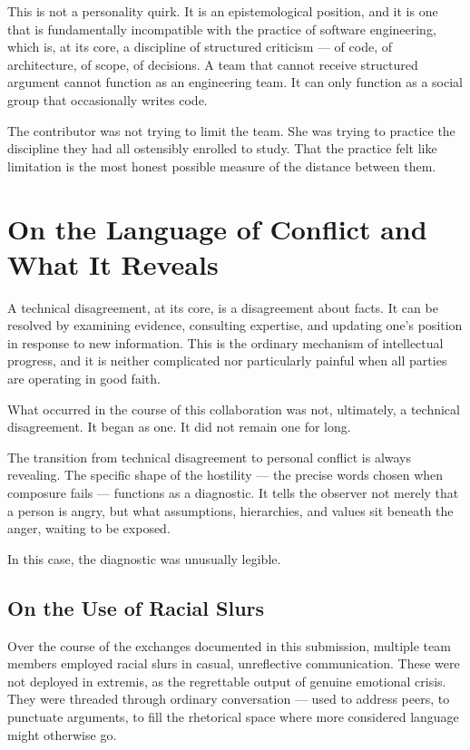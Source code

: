 \documentclass[11pt,a4paper]{book}
\begin{document}
This is not a personality quirk. It is an epistemological position, and it is one that is fundamentally incompatible with the practice of software engineering, which is, at its core, a discipline of structured criticism --- of code, of architecture, of scope, of decisions. A team that cannot receive structured argument cannot function as an engineering team. It can only function as a social group that occasionally writes code.
 
The contributor was not trying to limit the team. She was trying to practice the discipline they had all ostensibly enrolled to study. That the practice felt like limitation is the most honest possible measure of the distance between them.
 
\section{On the Language of Conflict and What It Reveals}
 
A technical disagreement, at its core, is a disagreement about facts. It can be resolved by examining evidence, consulting expertise, and updating one's position in response to new information. This is the ordinary mechanism of intellectual progress, and it is neither complicated nor particularly painful when all parties are operating in good faith.
 
What occurred in the course of this collaboration was not, ultimately, a technical disagreement. It began as one. It did not remain one for long.
 
The transition from technical disagreement to personal conflict is always revealing. The specific shape of the hostility --- the precise words chosen when composure fails --- functions as a diagnostic. It tells the observer not merely that a person is angry, but what assumptions, hierarchies, and values sit beneath the anger, waiting to be exposed.
 
In this case, the diagnostic was unusually legible.
 
\subsection{On the Use of Racial Slurs}
 
Over the course of the exchanges documented in this submission, multiple team members employed racial slurs in casual, unreflective communication. These were not deployed in extremis, as the regrettable output of genuine emotional crisis. They were threaded through ordinary conversation --- used to address peers, to punctuate arguments, to fill the rhetorical space where more considered language might otherwise go.
 
\end{document}
